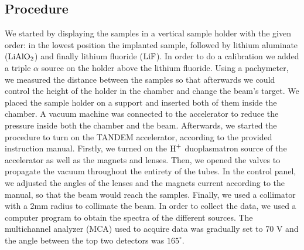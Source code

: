 \documentclass{article}
\begin{document}
\begin{multicols}{2}


\subsection{Procedure}
    \label{sec:procedure}

We started by displaying the samples in a vertical sample holder with the given order: in the lowest position the implanted sample, followed by lithium aluminate ($\ce{LiAlO2}$) and finally lithium fluoride ($\ce{LiF}$). 
In order to do a calibration we added a triple $\alpha$ source on the holder above the lithium fluoride. 
Using a pachymeter, we measured the distance between the samples so that afterwards we could control the height of the holder in the chamber and change the beam's target.
We placed the sample holder on a support and inserted both of them inside the chamber. 
A vacuum machine was connected to the accelerator to reduce the pressure inside both the chamber and the beam.
Afterwards, we started the procedure to turn on the TANDEM accelerator, according to the provided instruction manual. 
Firstly, we turned on the $\ce{H^+}$ duoplasmatron source of the accelerator as well as the magnets and lenses. 
Then, we opened the valves to propagate the vacuum throughout the entirety of the tubes.
In the control panel, we adjusted the angles of the lenses and the magnets current according to the manual, so that the beam would reach the samples. 
Finally, we used a collimator with a 2mm radius to collimate the beam.
In order to collect the data, we used a computer program to obtain the spectra of the different sources. 
The multichannel analyzer (MCA) used to acquire data was gradually set to 70 V and the angle between the top two detectors was $165 ^{\circ}$.


\end{multicols}
\end{document}
